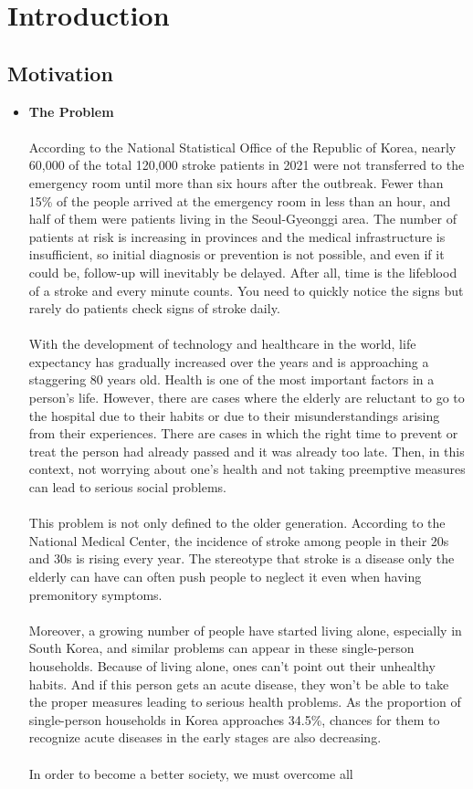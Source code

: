 \section{\textbf{Introduction}}
\subsection{\textbf{Motivation}\\}
\begin{itemize}
    \item \textbf{The Problem}\\
    \\ \cite{r8} According to the National Statistical Office of the Republic of Korea, nearly 60,000 of the total 120,000 stroke patients in 2021 were not transferred to the emergency room until more than six hours after the outbreak. Fewer than 15\% of the people arrived at the emergency room in less than an hour, and half of them were patients living in the Seoul-Gyeonggi area. \cite{r9} The number of patients at risk is increasing in provinces and the medical infrastructure is insufficient, so initial diagnosis or prevention is not possible, and even if it could be, follow-up will inevitably be delayed. After all, time is the lifeblood of a stroke and every minute counts. You need to quickly notice the signs but rarely do patients check signs of stroke daily.\\ \\With the development of technology and healthcare in the world, life expectancy has gradually increased over the years and is approaching a staggering 80 years old. Health is one of the most important factors in a person's life. However, there are cases where the elderly are reluctant to go to the hospital due to their habits or due to their misunderstandings arising from their experiences. There are cases in which the right time to prevent or treat the person had already passed and it was already too late. Then, in this context, not worrying about one’s health and not taking preemptive measures can lead to serious social problems.\\ \\This problem is not only defined to the older generation. \cite{r8} According to the National Medical Center, the incidence of stroke among people in their 20s and 30s is rising every year. The stereotype that stroke is a disease only the elderly can have can often push people to neglect it even when having premonitory symptoms.\\ \\Moreover, a growing number of people have started living alone, especially in South Korea, and similar problems can appear in these single-person households. Because of living alone, ones can’t point out their unhealthy habits. And if this person gets an acute disease, they won’t be able to take the proper measures leading to serious health problems. \cite{r10} As the proportion of single-person households in Korea approaches 34.5\%, chances for them to recognize acute diseases in the early stages are also decreasing.\\ \\In order to become a better society, we must overcome all 
\end{itemize}
